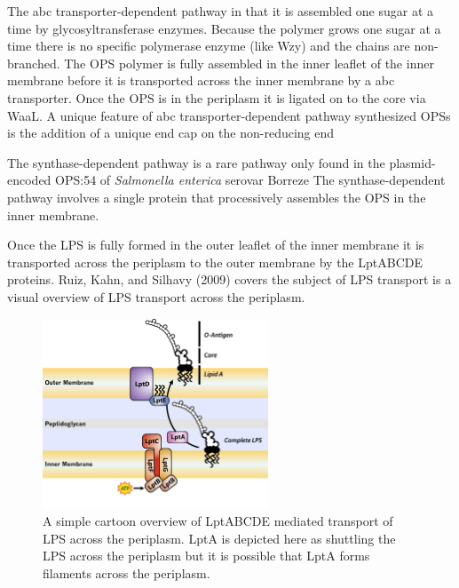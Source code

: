 The \ac{abc} transporter-dependent pathway in that  it is assembled one sugar at
a time by glycosyltransferase enzymes. Because the polymer grows one sugar at a
time there is no specific polymerase enzyme (like Wzy) and the chains are
non-branched. The \ac{OPS} polymer is fully assembled in the inner leaflet of
the inner membrane before it is transported across the inner membrane by a
\ac{abc} transporter. Once the \ac{OPS} is in the periplasm it is ligated on to
the core via WaaL.
A unique feature of \ac{abc} transporter-dependent pathway synthesized \acp{OPS} is the addition of a unique end cap on the non-reducing end 

The synthase-dependent pathway is a rare pathway only found in the plasmid-encoded \ac{OPS}:54 of \textit{Salmonella enterica} serovar Borreze The synthase-dependent pathway involves a single protein that processively assembles the \ac{OPS} in the inner membrane.

Once the \ac{LPS} is fully formed in the outer leaflet of the inner membrane it is transported across the periplasm to the outer membrane by the LptABCDE proteins. Ruiz, Kahn, and Silhavy (2009) covers the subject of \ac{LPS} transport  is a visual overview of \ac{LPS} transport across the periplasm.
 
\begin{figure}[htb]
  	\begin{center}
   		\includegraphics[width=0.6\textwidth]{intro/img/lpstransport.pdf}
   	\end{center}
   	\caption[A simple overview of \ac{LPS} transport across the periplasm]{ A simple cartoon overview of  LptABCDE mediated transport of \ac{LPS} across the periplasm. LptA is depicted here as shuttling the \ac{LPS} across the periplasm but it is possible that LptA forms filaments across the periplasm.}
\label{fig:lpstransport}
\end{figure}   
